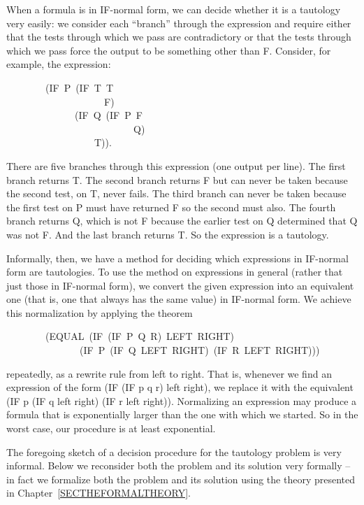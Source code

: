 \documentclass[11pt]{book}
\newenvironment{pubasis}{\begin{flushleft}\ttfamily\small}{\normalsize\rmfamily\end{flushleft}}
\begin{document}
When a formula is in IF-normal form, we can decide whether
it is a tautology very easily: we  consider each ``branch''
through the expression and require  either that the tests through
which we pass are contradictory or that the tests through which
we pass force the output to be something other than F.  Consider, for example,
the expression:
\begin{pubasis}
~~~~~~~~(IF~P~(IF~T~T\\
~~~~~~~~~~~~~~~~~~~~F)\\
~~~~~~~~~~~~~~(IF~Q~(IF~P~F\\
~~~~~~~~~~~~~~~~~~~~~~~~~~Q)\\
~~~~~~~~~~~~~~~~~~T)).\\
\end{pubasis}
There are five branches through this expression (one output per line).  The first
branch returns T.  The second branch returns F but can never be taken because the
second test, on T, never fails.  The third branch  can never be
taken because the first test on P must have returned F so the
second must also.  The fourth branch returns Q, which is not
F because the earlier test on Q determined that Q was not F.
And the last branch returns T.
So the expression is a tautology.

Informally, then, we have a method for deciding which expressions
in IF-normal form are tautologies.  To use the method on expressions in general (rather
that just those in IF-normal form),
we  convert the given expression into an equivalent one
(that is, one that always has the same value) in
IF-normal form.  We achieve this normalization by applying the
theorem
\begin{pubasis}
~~~~~~~~(EQUAL~(IF~(IF~P~Q~R)~LEFT~RIGHT)\\
~~~~~~~~~~~~~~~(IF~P~(IF~Q~LEFT~RIGHT)~(IF~R~LEFT~RIGHT)))\\
\end{pubasis}
repeatedly, as a rewrite rule from left to right.  That is, whenever
we find an expression of the form (IF (IF p q r) left right), we
replace it with the equivalent (IF p (IF q left right) (IF r left right)).
Normalizing an expression may produce a
formula that is exponentially larger than the one with which
we started.  So in the worst case, our procedure is 
at least exponential.

The foregoing sketch of a decision procedure for the tautology
problem is very informal.   Below we  reconsider both the
problem and its solution very formally -- in fact we 
formalize both the problem and its solution using the
theory presented in Chapter~\ref{SECTHEFORMALTHEORY}.
\end{document}
